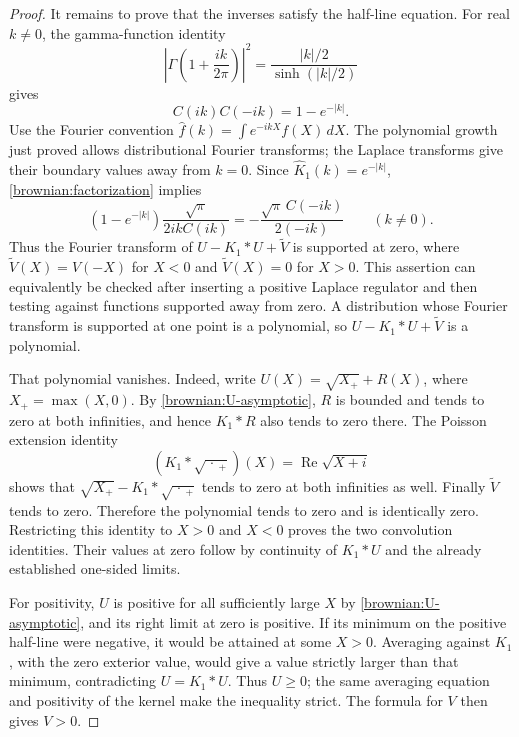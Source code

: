 \begin{proof}
It remains to prove that the inverses satisfy the half-line equation.
For real $k\ne0$, the gamma-function identity
\[
 \left|\Gamma\left(1+\frac{ik}{2\pi}\right)\right|^2
  =\frac{|k|/2}{\sinh(|k|/2)}
\]
gives
\begin{equation}\label{brownian:factorization}
 C(ik)C(-ik)=1-e^{-|k|}.
\end{equation}
Use the Fourier convention $\widehat f(k)=\int e^{-ikX}f(X)\,dX$.
The polynomial growth just proved allows distributional Fourier
transforms; the Laplace transforms give their boundary values away
from $k=0$.  Since $\widehat K_1(k)=e^{-|k|}$,
\eqref{brownian:factorization} implies
\[
 (1-e^{-|k|})\frac{\sqrt\pi}{2ikC(ik)}
   =-\frac{\sqrt\pi\,C(-ik)}{2(-ik)}
 \qquad(k\ne0).
\]
Thus the Fourier transform of
$U-K_1*U+\widetilde V$ is supported at zero, where
$\widetilde V(X)=V(-X)$ for $X<0$ and $\widetilde V(X)=0$ for $X>0$.
This assertion can equivalently be checked after inserting a positive
Laplace regulator and then testing against functions supported away
from zero.  A distribution whose Fourier transform is supported at
one point is a polynomial, so $U-K_1*U+\widetilde V$ is a polynomial.

That polynomial vanishes.  Indeed, write
$U(X)=\sqrt{X_+}+R(X)$, where $X_+=\max(X,0)$.
By \eqref{brownian:U-asymptotic}, $R$ is bounded and tends to zero at
both infinities, and hence $K_1*R$ also tends to zero there.
The Poisson extension identity
\[
 (K_1*\sqrt{\,\cdot\,_+})(X)=\operatorname{Re}\sqrt{X+i}
\]
shows that $\sqrt{X_+}-K_1*\sqrt{\,\cdot\,_+}$ tends to zero at
both infinities as well.  Finally $\widetilde V$ tends to zero.
Therefore the polynomial tends to zero and is identically zero.
Restricting this identity to $X>0$ and $X<0$ proves the two
convolution identities.  Their values at zero follow by continuity
of $K_1*U$ and the already established one-sided limits.

For positivity, $U$ is positive for all sufficiently large $X$ by
\eqref{brownian:U-asymptotic}, and its right limit at zero is positive.
If its minimum on the positive half-line were negative, it would be
attained at some $X>0$.  Averaging against $K_1$, with the zero
exterior value, would give a value strictly larger than that minimum,
contradicting $U=K_1*U$.  Thus $U\ge0$; the same averaging equation
and positivity of the kernel make the inequality strict.  The formula
for $V$ then gives $V>0$.
\end{proof}

